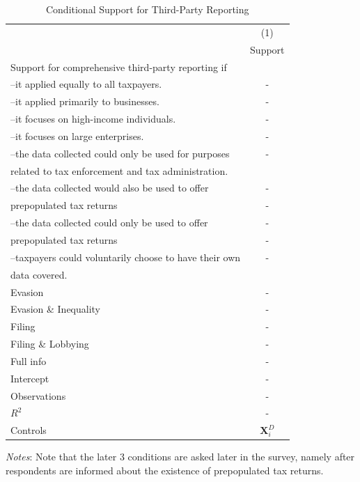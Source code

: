\documentclass[11pt]{article}
\begin{document}
\begin{table}[!htbp]\centering
\caption{Conditional Support for Third-Party Reporting}
\label{tab:conditionalsupporttpr}
\begin{threeparttable}
\begin{tabular}{l|c}
\toprule
 & (1)\\
 & Support \\
 \midrule
Support for comprehensive third-party reporting if \\[0.25em]
--it applied equally to all taxpayers. &-\\[0.25em]
--it applied primarily to businesses.&-\\[0.25em]
--it focuses on high-income individuals. &- \\[0.25em]
--it focuses on large enterprises.&- \\[0.25em]
--the data collected could only be used for purposes  & - \\
related to tax enforcement and tax administration.\\[0.25em]
--the data collected would also be used to offer & - \\
prepopulated tax returns & - \\[0.25em]
--the data collected could only be used to offer & - \\
prepopulated tax returns & - \\[0.25em]
--taxpayers could voluntarily choose to have their own & -\\ 
data covered.\\[1em]
Evasion       & - \\
Evasion \& Inequality     & - \\
Filing            & - \\
Filing \& Lobbying           & - \\
Full info               & - \\[0.5em]
Intercept &-  \\
\midrule
Observations                        &-       \\
$R^2$                               &-    \\
Controls                 &    $\mathbf{X}_{i}^{D}$      \\
\bottomrule
\end{tabular}
\begin{tablenotes}[flushleft]
\footnotesize
\item \textit{Notes}: Note that the later 3 conditions are asked later in the survey, namely after respondents are informed about the existence of prepopulated tax returns.   
\end{tablenotes}
\end{threeparttable}
\end{table} 
\end{document}

